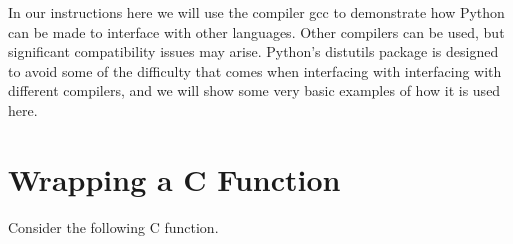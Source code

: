 In our instructions here we will use the compiler gcc to demonstrate how Python can be made to interface with other languages.
Other compilers can be used, but significant compatibility issues may arise.
Python's distutils package is designed to avoid some of the difficulty that comes when interfacing with interfacing with different compilers, and we will show some very basic examples of how it is used here.

\section*{Wrapping a C Function}

Consider the following C function.








